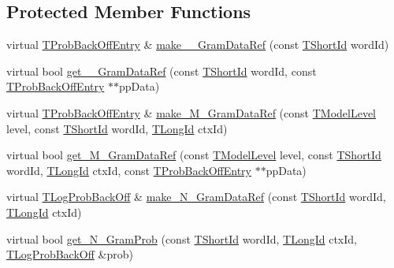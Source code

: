 \subsection*{Protected Member Functions}
\begin{DoxyCompactItemize}
\item 
virtual \hyperlink{structuva_1_1smt_1_1tries_1_1_t_prob_back_off_entry}{T\+Prob\+Back\+Off\+Entry} \& \hyperlink{classuva_1_1smt_1_1tries_1_1_c2_d_map_trie_a9d347a0f25c993025191c45034805856}{make\+\_\+\_\+\+Gram\+Data\+Ref} (const \hyperlink{namespaceuva_1_1smt_1_1hashing_adcf22e1982ad09d3a63494c006267469}{T\+Short\+Id} word\+Id)
\item 
virtual bool \hyperlink{classuva_1_1smt_1_1tries_1_1_c2_d_map_trie_a1966e99d364c9b4edf326e1ca1c171a8}{get\+\_\+\_\+\+Gram\+Data\+Ref} (const \hyperlink{namespaceuva_1_1smt_1_1hashing_adcf22e1982ad09d3a63494c006267469}{T\+Short\+Id} word\+Id, const \hyperlink{structuva_1_1smt_1_1tries_1_1_t_prob_back_off_entry}{T\+Prob\+Back\+Off\+Entry} $\ast$$\ast$pp\+Data)
\item 
virtual \hyperlink{structuva_1_1smt_1_1tries_1_1_t_prob_back_off_entry}{T\+Prob\+Back\+Off\+Entry} \& \hyperlink{classuva_1_1smt_1_1tries_1_1_c2_d_map_trie_a6dc852e1ce8070e89f4ca5678d9f901b}{make\+\_\+\+M\+\_\+\+Gram\+Data\+Ref} (const \hyperlink{namespaceuva_1_1smt_1_1tries_a20577a44b3a42d26524250634379b7cb}{T\+Model\+Level} level, const \hyperlink{namespaceuva_1_1smt_1_1hashing_adcf22e1982ad09d3a63494c006267469}{T\+Short\+Id} word\+Id, \hyperlink{namespaceuva_1_1smt_1_1hashing_a5992ac0dea0fb3226fb403ede09fad55}{T\+Long\+Id} ctx\+Id)
\item 
virtual bool \hyperlink{classuva_1_1smt_1_1tries_1_1_c2_d_map_trie_a064c3f9f62b4806a031b5277d3b36f56}{get\+\_\+\+M\+\_\+\+Gram\+Data\+Ref} (const \hyperlink{namespaceuva_1_1smt_1_1tries_a20577a44b3a42d26524250634379b7cb}{T\+Model\+Level} level, const \hyperlink{namespaceuva_1_1smt_1_1hashing_adcf22e1982ad09d3a63494c006267469}{T\+Short\+Id} word\+Id, \hyperlink{namespaceuva_1_1smt_1_1hashing_a5992ac0dea0fb3226fb403ede09fad55}{T\+Long\+Id} ctx\+Id, const \hyperlink{structuva_1_1smt_1_1tries_1_1_t_prob_back_off_entry}{T\+Prob\+Back\+Off\+Entry} $\ast$$\ast$pp\+Data)
\item 
virtual \hyperlink{namespaceuva_1_1smt_1_1tries_acd0660255dd9ef5d644f01de49102750}{T\+Log\+Prob\+Back\+Off} \& \hyperlink{classuva_1_1smt_1_1tries_1_1_c2_d_map_trie_a13feecc55ccca3f2dc4a97e30de68e2a}{make\+\_\+\+N\+\_\+\+Gram\+Data\+Ref} (const \hyperlink{namespaceuva_1_1smt_1_1hashing_adcf22e1982ad09d3a63494c006267469}{T\+Short\+Id} word\+Id, \hyperlink{namespaceuva_1_1smt_1_1hashing_a5992ac0dea0fb3226fb403ede09fad55}{T\+Long\+Id} ctx\+Id)
\item 
virtual bool \hyperlink{classuva_1_1smt_1_1tries_1_1_c2_d_map_trie_ae311367e3ac7177c90186a90ec00eede}{get\+\_\+\+N\+\_\+\+Gram\+Prob} (const \hyperlink{namespaceuva_1_1smt_1_1hashing_adcf22e1982ad09d3a63494c006267469}{T\+Short\+Id} word\+Id, \hyperlink{namespaceuva_1_1smt_1_1hashing_a5992ac0dea0fb3226fb403ede09fad55}{T\+Long\+Id} ctx\+Id, \hyperlink{namespaceuva_1_1smt_1_1tries_acd0660255dd9ef5d644f01de49102750}{T\+Log\+Prob\+Back\+Off} \&prob)
\end{DoxyCompactItemize}
